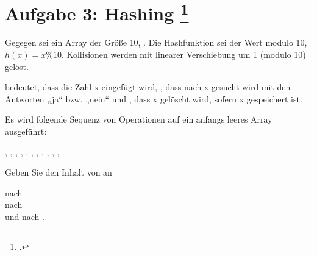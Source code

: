 \documentclass{lehramt-informatik-aufgabe}
\begin{document}

\section{Aufgabe 3: Hashing
\footcite[Thema 2 Aufgabe 3 Seite 4]{examen:66115:2010:09}
}

Gegegen sei ein Array der Größe 10, \zB {}. Die Hashfunktion sei der Wert modulo 10, $h(x) = x \% 10$.
Kollisionen werden mit linearer Verschiebung um 1 (modulo 10) gelöst.

 bedeutet, dass die Zahl x eingefügt wird, ,
dass nach x gesucht wird mit den Antworten „ja“ bzw. „nein“ und
, dass x gelöscht wird, sofern x gespeichert ist.

Es wird folgende Sequenz von Operationen auf ein anfangs leeres Array
ausgeführt:

,
,
,
,
,
,
,
,
,
,
,

Geben Sie den Inhalt von  an

nach \\
nach \\
und nach .
\end{document}
